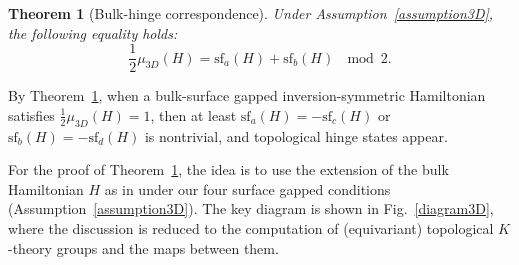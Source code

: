 \documentclass{amsart}
\theoremstyle{plain}
\newtheorem{theorem}{Theorem}[section]
\theoremstyle{definition}
\theoremstyle{remark}
\renewcommand{\sf}{\mathrm{sf}}
\begin{document}
\begin{theorem}[Bulk-hinge correspondence]
\label{theorem3D}
Under Assumption~\ref{assumption3D}, the following equality holds:
\begin{equation*}
	\frac{1}{2}\mu_{3D}(H) = \sf_a(H) + \sf_b(H) \ \mod 2.
\end{equation*}
\end{theorem}

By Theorem~\ref{theorem3D}, when a bulk-surface gapped inversion-symmetric Hamiltonian satisfies $\frac{1}{2}\mu_{3D}(H) = 1$, then at least $\sf_a(H) = - \sf_c(H)$ or $\sf_b(H) = -\sf_d(H)$ is nontrivial, and topological hinge states appear.

For the proof of Theorem~\ref{theorem3D}, the idea is to use the extension of the bulk Hamiltonian $H$ as in \cite{Hayashi5} under our four surface gapped conditions (Assumption~\ref{assumption3D}).
The key diagram is shown in Fig.~\ref{diagram3D}, where the discussion is reduced to the computation of (equivariant) topological $K$-theory groups and the maps between them.

\end{document}
